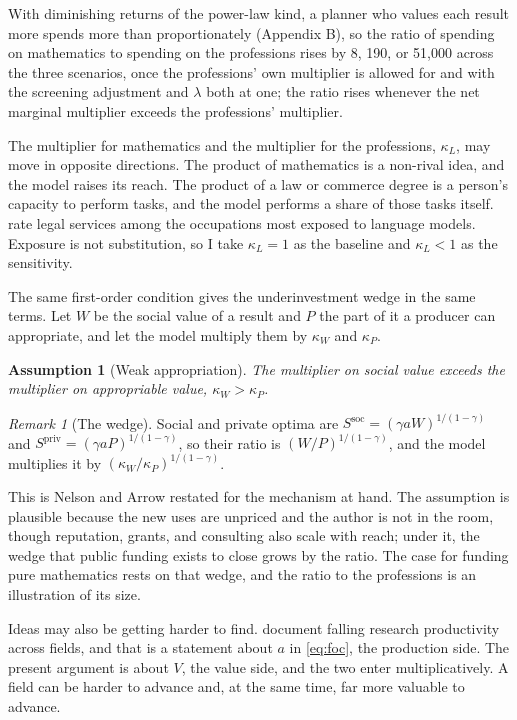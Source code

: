 \documentclass[11pt]{article}
\newtheorem{assumption}{Assumption}
\theoremstyle{definition}
\theoremstyle{remark}
\newtheorem{remark}{Remark}
\begin{document}
With diminishing returns of the power-law kind, a planner who values each result more spends more than proportionately (Appendix B), so the ratio of spending on mathematics to spending on the professions rises by 8, 190, or 51{,}000 across the three scenarios, once the professions' own multiplier is allowed for and with the screening adjustment and $\lambda$ both at one; the ratio rises whenever the net marginal multiplier exceeds the professions' multiplier.

The multiplier for mathematics and the multiplier for the professions, $\kappa_L$, may move in opposite directions. The product of mathematics is a non-rival idea, and the model raises its reach. The product of a law or commerce degree is a person's capacity to perform tasks, and the model performs a share of those tasks itself. \citet{eloundou2023} rate legal services among the occupations most exposed to language models. Exposure is not substitution, so I take $\kappa_L = 1$ as the baseline and $\kappa_L < 1$ as the sensitivity.

The same first-order condition gives the underinvestment wedge in the same terms. Let $W$ be the social value of a result and $P$ the part of it a producer can appropriate, and let the model multiply them by $\kappa_W$ and $\kappa_P$.

\begin{assumption}[Weak appropriation]
The multiplier on social value exceeds the multiplier on appropriable value, $\kappa_W > \kappa_P$.
\end{assumption}

\begin{remark}[The wedge]
Social and private optima are $S^{\mathrm{soc}} = (\gamma a W)^{1/(1-\gamma)}$ and $S^{\mathrm{priv}} = (\gamma a P)^{1/(1-\gamma)}$, so their ratio is $(W/P)^{1/(1-\gamma)}$, and the model multiplies it by $(\kappa_W / \kappa_P)^{1/(1-\gamma)}$.
\end{remark}

This is Nelson and Arrow restated for the mechanism at hand. The assumption is plausible because the new uses are unpriced and the author is not in the room, though reputation, grants, and consulting also scale with reach; under it, the wedge that public funding exists to close grows by the ratio. The case for funding pure mathematics rests on that wedge, and the ratio to the professions is an illustration of its size.

Ideas may also be getting harder to find. \citet{bloom2020} document falling research productivity across fields, and that is a statement about $a$ in \eqref{eq:foc}, the production side. The present argument is about $V$, the value side, and the two enter multiplicatively. A field can be harder to advance and, at the same time, far more valuable to advance.
\end{document}
